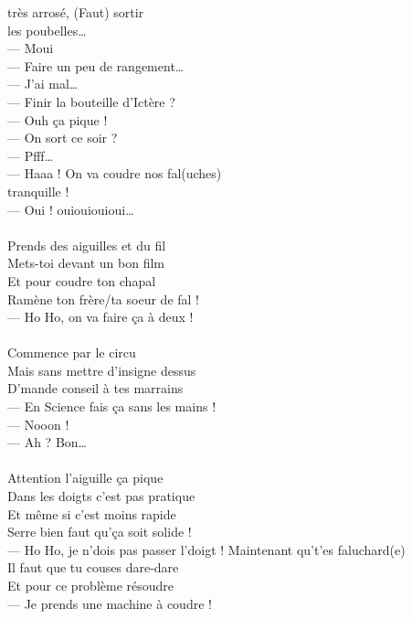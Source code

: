 
 très arrosé, (Faut) sortir
\\les poubelles…
\\— Moui
\\— Faire un peu de rangement…
\\— J’ai mal…
\\— Finir la bouteille d’Ictère ?
\\— Ouh ça pique !
\\— On sort ce soir ?
\\— Pfff…
\\— Haaa ! On va coudre nos fal(uches)
\\tranquille !
\\— Oui ! ouiouiouioui…
\\\\Prends des aiguilles et du fil
\\Mets-toi devant un bon film
\\Et pour coudre ton chapal
\\Ramène ton frère/ta soeur de fal !
\\— Ho Ho, on va faire ça à deux !
\\\\Commence par le circu
\\Mais sans mettre d’insigne dessus
\\D’mande conseil à tes marrains
\\— En Science fais ça sans les mains !
\\— Nooon !
\\— Ah ? Bon…
\\\\Attention l’aiguille ça pique
\\Dans les doigts c’est pas pratique
\\Et même si c’est moins rapide
\\Serre bien faut qu’ça soit solide !
\\— Ho Ho, je n’dois pas passer l’doigt !
\breakpage
Maintenant qu’t’es faluchard(e)
\\Il faut que tu couses dare-dare
\\Et pour ce problème résoudre
\\— Je prends une machine à coudre !
